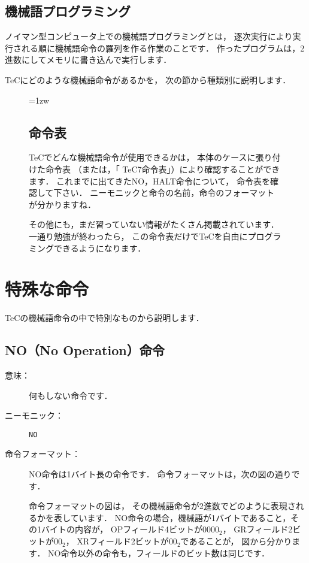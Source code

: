 \subsection{機械語プログラミング}
ノイマン型コンピュータ上での機械語プログラミングとは，
逐次実行により実行される順に機械語命令の羅列を作る作業のことです．
作ったプログラムは，2進数にしてメモリに書き込んで実行します．

TeCにどのような機械語命令があるかを，
次の節から種類別に説明します．

\begin{figure}[btp]
\begin{framed}{\parindent=1zw
\subsection*{命令表}
TeCでどんな機械語命令が使用できるかは，
本体のケースに張り付けた命令表
（または，「 TeC7命令表」）により確認することができます．
これまでに出てきたNO，HALT命令について，
命令表を確認して下さい．
ニーモニックと命令の名前，命令のフォーマットが分かりますね．

その他にも，まだ習っていない情報がたくさん掲載されています．
一通り勉強が終わったら，
この命令表だけでTeCを自由にプログラミングできるようになります．
}\end{framed}
\end{figure}

\newpage
\section{特殊な命令}
TeCの機械語命令の中で特別なものから説明します．

\subsection{NO（No Operation）命令}
\begin{description}
\item[意味：]何もしない命令です．

\item[ニーモニック：] {\tt NO}

\item[命令フォーマット：] NO命令は1バイト長の命令です．
命令フォーマットは，次の図の通りです．


命令フォーマットの図は，
その機械語命令が2進数でどのように表現されるかを表しています．
NO命令の場合，機械語が1バイトであること，その1バイトの内容が，
OPフィールド4ビットが$0000_2$，
GRフィールド2ビットが$00_2$，
XRフィールド2ビットが$00_2$であることが，
図から分かります．
NO命令以外の命令も，フィールドのビット数は同じです．
\end{description}

